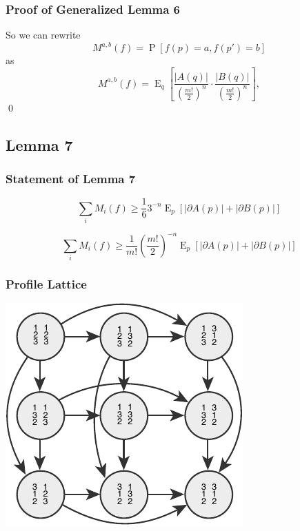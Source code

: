 \documentclass[aspectratio=169]{beamer}
\DeclareMathOperator{\probability}{P}
\DeclareMathOperator{\expectedvalue}{E}
\begin{document}
		\begin{frame}
			\frametitle{Proof of Generalized Lemma 6}

			So we can rewrite
			\[
				M^{a,b}(f) = \probability[f(p) = a, f(p') = b]
			\]
			as
			\[
				M^{a,b}(f) = \expectedvalue_{q} \left[ \frac{|A(q)|}{\left(\frac{m!}{2}\right)^n} \cdot \frac{|B(q)|}{\left(\frac{m!}{2}\right)^n} \right],
			\]
			\qed
		\end{frame}


	\subsection{Lemma 7}

		\begin{frame}
			\frametitle{Statement of Lemma 7}

			\begin{lemma}
				\[
					\sum_i M_i(f) \ge \frac{1}{6} 3^{-n} \expectedvalue_p \left[|\partial A(p)| + |\partial B(p)| \right]
				\]
			\end{lemma}

			\begin{lemma}
				\[
					\sum_i M_i(f) \ge \frac{1}{m!} \left(\frac{m!}{2}\right)^{-n} \expectedvalue_p \left[|\partial A(p)| + |\partial B(p)| \right]
				\]
			\end{lemma}
		\end{frame}

		\begin{frame}
			\frametitle{Profile Lattice}

			\centerline{\includegraphics[height=0.7\paperheight, keepaspectratio]{../figures/profile_lattice.pdf}}
		\end{frame}
\end{document}
